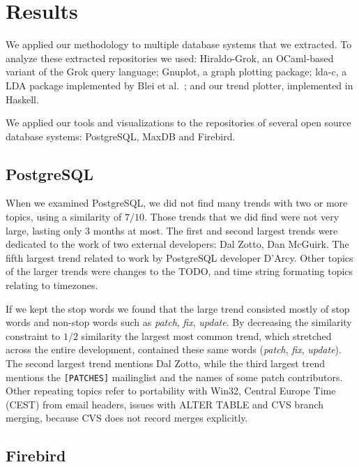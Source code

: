 \documentclass[times, 10pt,twocolumn]{article}
\newcommand{\shrinkit}{\vspace*{-.3em}}
\begin{document}
\shrinkit
\section{Results}
\shrinkit

We applied our methodology to multiple database systems that we
extracted.  To analyze these extracted repositories we used:
Hiraldo-Grok, an OCaml-based variant of the Grok query language;
Gnuplot, a graph plotting package; lda-c, a LDA package implemented by
Blei et al.~\cite{944937}; and our trend plotter, implemented in
Haskell.

We applied our tools and visualizations to the repositories of several
open source database systems: PostgreSQL, MaxDB and Firebird.

\shrinkit
\subsection{PostgreSQL}
\shrinkit


When we examined PostgreSQL, we did not find many trends with two or
more topics, using a similarity of $7/10$. Those trends that we did find
were not very large, lasting only 3 months at most. The first and second
largest trends were dedicated to the work of two external developers:
Dal Zotto, Dan McGuirk. The fifth largest trend related to work by
PostgreSQL developer D'Arcy. Other topics of the larger trends were
changes to the TODO, and time string formating topics
relating to timezones.

If we kept the stop words we found that the large trend consisted
mostly of stop words and non-stop words such as \emph{patch},
\emph{fix}, \emph{update}.  By decreasing the similarity constraint to
$1/2$ similarity the largest most common trend, which
stretched across the entire development, contained these same words
(\emph{patch}, \emph{fix}, \emph{update}). The second largest trend
mentions Dal Zotto, while the third largest trend mentions the
\texttt{[PATCHES]} mailinglist and the names of some patch
contributors.  Other repeating topics refer to portability with Win32,
Central Europe Time (CEST) from email headers, issues with ALTER TABLE
and CVS branch merging, because CVS does not record merges explicitly.


\shrinkit
\subsection{Firebird}
\shrinkit
\end{document}
